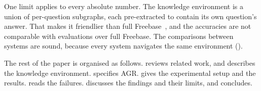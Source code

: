 One limit applies to every absolute number. The knowledge environment is a union
of per-question subgraphs, each pre-extracted to contain its own question's
answer. That makes it friendlier than full
Freebase~\cite{bollacker2008freebase}, and the accuracies are not comparable
with evaluations over full Freebase. The comparisons between systems are sound,
because every system navigates the same environment ().

The rest of the paper is organised as follows.  reviews
related work, and  describes the knowledge environment.
 specifies AGR.  gives the experimental
setup and  the results.  reads the failures.
 discusses the findings and their limits, and
 concludes.

\endinput
